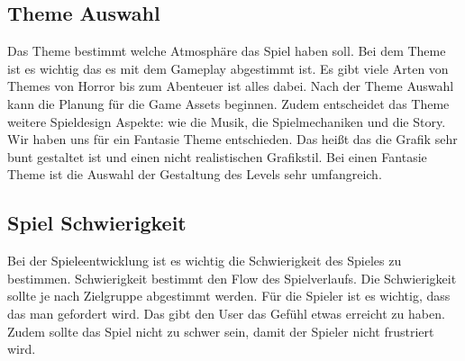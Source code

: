 \subsection{Theme Auswahl}
Das Theme bestimmt welche Atmosphäre das Spiel haben soll. Bei dem Theme ist es wichtig das es mit dem Gameplay abgestimmt ist. Es gibt viele Arten von Themes von Horror bis zum Abenteuer ist alles dabei. Nach der Theme Auswahl kann die Planung für die  Game Assets beginnen. Zudem entscheidet das Theme weitere Spieldesign Aspekte: wie die Musik, die Spielmechaniken und die  Story. Wir haben uns für ein Fantasie Theme entschieden. Das heißt das die Grafik sehr bunt gestaltet ist und einen nicht realistischen Grafikstil. Bei einen Fantasie Theme ist die Auswahl der Gestaltung des Levels sehr umfangreich. 


\subsection{Spiel Schwierigkeit}

Bei der Spieleentwicklung ist es wichtig die Schwierigkeit des Spieles zu bestimmen. Schwierigkeit bestimmt den Flow des Spielverlaufs. Die Schwierigkeit sollte je nach Zielgruppe abgestimmt werden. Für die Spieler ist es wichtig, dass das man gefordert wird. Das gibt den User das Gefühl etwas erreicht zu haben. Zudem sollte das Spiel nicht zu schwer sein, damit der Spieler nicht frustriert wird. 

